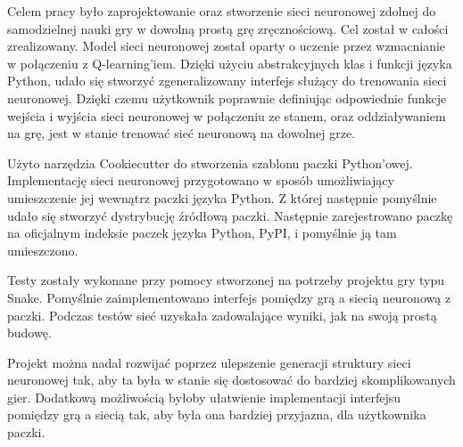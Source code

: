 Celem pracy było zaprojektowanie oraz stworzenie sieci neuronowej zdolnej do samodzielnej nauki gry w dowolną prostą grę zręcznościową. Cel został w całości zrealizowany. Model sieci neuronowej został oparty o uczenie przez wzmacnianie w połączeniu z Q-learning'iem. Dzięki użyciu abstrakcyjnych klas i funkcji języka Python, udało się stworzyć zgeneralizowany interfejs służący do trenowania sieci neuronowej. Dzięki czemu użytkownik poprawnie definiując odpowiednie funkcje wejścia i wyjścia sieci neuronowej w połączeniu ze stanem, oraz oddziaływaniem na grę, jest w stanie trenować sieć neuronową na dowolnej grze.

Użyto narzędzia Cookiecutter do stworzenia szablonu paczki Python'owej. Implementację sieci neuronowej przygotowano w sposób umożliwiający umieszczenie jej wewnątrz paczki języka Python. Z której następnie pomyślnie udało się stworzyć dystrybucję źródłową paczki. Następnie zarejestrowano paczkę na oficjalnym indeksie paczek języka Python, PyPI, i pomyślnie ją tam umieszczono.

Testy zostały wykonane przy pomocy stworzonej na potrzeby projektu gry typu Snake. Pomyślnie zaimplementowano interfejs pomiędzy grą a siecią neuronową z paczki. Podczas testów sieć uzyskała zadowalające wyniki, jak na swoją prostą budowę.

Projekt można nadal rozwijać poprzez ulepszenie generacji struktury sieci neuronowej tak, aby ta była w stanie się dostosować do bardziej skomplikowanych gier. Dodatkową możliwością byłoby ułatwienie implementacji interfejsu pomiędzy grą a siecią tak, aby była ona bardziej przyjazna, dla użytkownika paczki.



